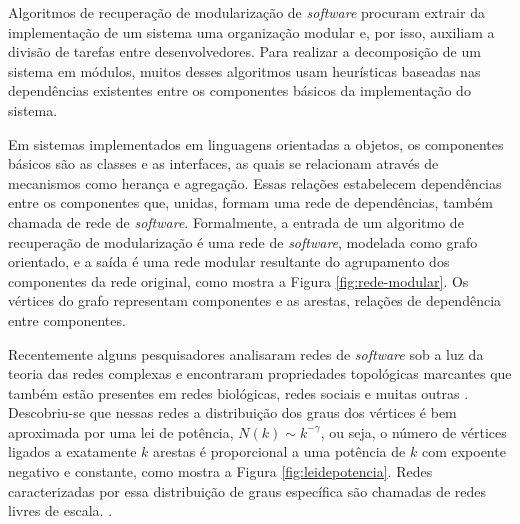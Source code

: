 \documentclass[12pt]{article}
\begin{document}
Algoritmos de recuperação de modularização de \emph{software} procuram extrair
da implementação de um sistema uma organização modular e, por isso, auxiliam a
divisão de tarefas entre desenvolvedores.  Para realizar a decomposição de um
sistema em módulos, muitos desses algoritmos usam heurísticas baseadas nas
dependências existentes entre os componentes básicos da implementação do
sistema.

Em sistemas implementados em linguagens orientadas a objetos, os componentes
básicos são as classes e as interfaces, as quais se relacionam através de
mecanismos como herança e agregação. Essas relações estabelecem dependências
entre os componentes que, unidas, formam uma rede de dependências, também
chamada de rede de \emph{software}. Formalmente, a entrada de um algoritmo de
recuperação de modularização é uma rede de \emph{software}, modelada como grafo
orientado, e a saída é uma rede modular resultante do agrupamento dos
componentes da rede original, como mostra a Figura \ref{fig:rede-modular}. Os
vértices do grafo representam componentes e as arestas, relações de dependência
entre componentes.


Recentemente alguns pesquisadores analisaram redes de \emph{software} sob a luz
da teoria das redes complexas e encontraram propriedades topológicas marcantes
que também estão presentes em redes biológicas, redes sociais e muitas outras
\cite{Myers2003,Valverde2003}. Descobriu-se que nessas redes a distribuição dos
graus dos vértices é bem aproximada por uma lei de potência, $N(k) \sim
k^{-\gamma}$, ou seja, o número de vértices ligados a exatamente $k$ arestas é
proporcional a uma potência de $k$ com expoente negativo e constante, como
mostra a Figura \ref{fig:leidepotencia}. Redes caracterizadas por essa
distribuição de graus específica são chamadas de redes livres de escala. %
\cite{Barabasi1999}.


\end{document}
